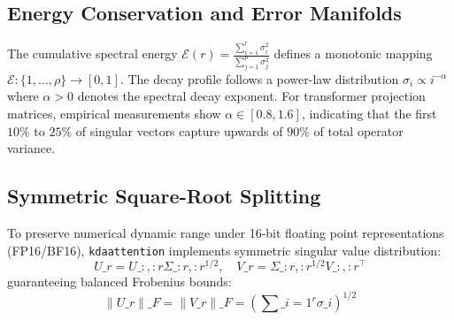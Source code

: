 \subsection{Energy Conservation and Error Manifolds}
The cumulative spectral energy $\mathcal{E}(r) = \frac{\sum_{i=1}^r \sigma_i^2}{\sum_{j=1}^\rho \sigma_j^2}$ defines a monotonic mapping $\mathcal{E}: \{1, \dots, \rho\} \to [0, 1]$. The decay profile follows a power-law distribution $\sigma_i \propto i^{-\alpha}$ where $\alpha > 0$ denotes the spectral decay exponent. For transformer projection matrices, empirical measurements show $\alpha \in [0.8, 1.6]$, indicating that the first $10\%$ to $25\%$ of singular vectors capture upwards of $90\%$ of total operator variance.

\subsection{Symmetric Square-Root Splitting}
To preserve numerical dynamic range under 16-bit floating point representations (FP16/BF16), \texttt{kdaattention} implements symmetric singular value distribution:
\[
U\_r = U\_{:, :r} \Sigma\_{:r, :r}^{1/2}, \quad V\_r = \Sigma\_{:r, :r}^{1/2} V\_{:, :r}^\top
\]
guaranteeing balanced Frobenius bounds:
\[
\|U\_r\|\_F = \|V\_r\|\_F = \left( \sum\_{i=1}^{r} \sigma\_i \right)^{1/2}
\]
